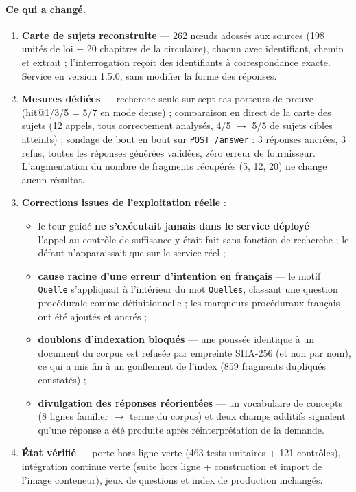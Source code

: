 \documentclass[a4paper,12pt]{report}
\begin{document}
\paragraph{Ce qui a changé.}
\begin{enumerate}
  \item \textbf{Carte de sujets reconstruite} — 262 nœuds adossés aux sources (198 unités de loi +
        20 chapitres de la circulaire), chacun avec identifiant, chemin et extrait ; l'interrogation
        reçoit des identifiants à correspondance exacte. Service en version 1.5.0, sans modifier la
        forme des réponses.
  \item \textbf{Mesures dédiées} — recherche seule sur sept cas porteurs de preuve (hit@1/3/5 = 5/7
        en mode dense) ; comparaison en direct de la carte des sujets (12 appels, tous correctement
        analysés, 4/5 $\rightarrow$ 5/5 de sujets cibles atteints) ; sondage de bout en bout sur
        \texttt{POST /answer} : 3 réponses ancrées, 3 refus, toutes les réponses générées validées,
        zéro erreur de fournisseur. L'augmentation du nombre de fragments récupérés (5, 12, 20) ne
        change aucun résultat.
  \item \textbf{Corrections issues de l'exploitation réelle} :
    \begin{itemize}
      \item le tour guidé \textbf{ne s'exécutait jamais dans le service déployé} — l'appel au
            contrôle de suffisance y était fait sans fonction de recherche ; le défaut
            n'apparaissait que sur le service réel ;
      \item \textbf{cause racine d'une erreur d'intention en français} — le motif
            \texttt{Quelle} s'appliquait à l'intérieur du mot \texttt{Quelles}, classant une
            question procédurale comme définitionnelle ; les marqueurs procéduraux français ont été
            ajoutés et ancrés ;
      \item \textbf{doublons d'indexation bloqués} — une poussée identique à un document du corpus
            est refusée par empreinte SHA-256 (et non par nom), ce qui a mis fin à un gonflement de
            l'index (859 fragments dupliqués constatés) ;
      \item \textbf{divulgation des réponses réorientées} — un vocabulaire de concepts (8 lignes
            familier $\rightarrow$ terme du corpus) et deux champs additifs signalent qu'une
            réponse a été produite après réinterprétation de la demande.
    \end{itemize}
  \item \textbf{État vérifié} — porte hors ligne verte (463 tests unitaires + 121 contrôles),
        intégration continue verte (suite hors ligne + construction et import de l'image conteneur),
        jeux de questions et index de production inchangés.
\end{enumerate}
\end{document}
